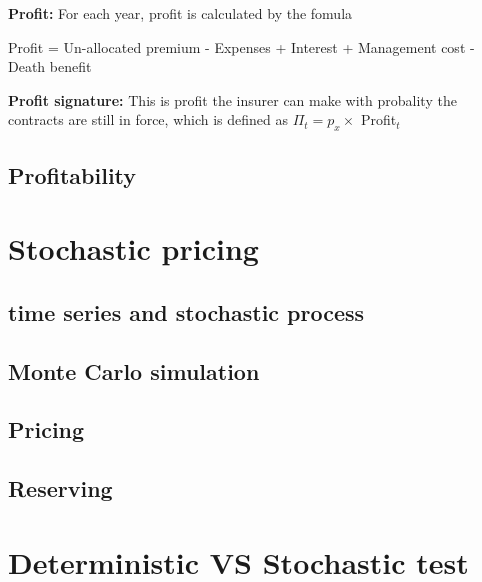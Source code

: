 \documentclass{report}
\begin{document}
\textbf{Profit:} For each year, profit is calculated by the fomula

Profit = Un-allocated premium - Expenses + Interest + Management cost - Death benefit

\textbf{Profit signature:} This is profit the insurer can make with probality the contracts are still in force, which is defined as $\Pi_t = p_x \times$ Profit$_t$


\subsection{Profitability}








\section{Stochastic pricing}
\subsection{time series and stochastic process}
\subsection{Monte Carlo simulation}
\subsection{Pricing}
\subsection{Reserving}



\section{Deterministic VS Stochastic test}
\end{document}
